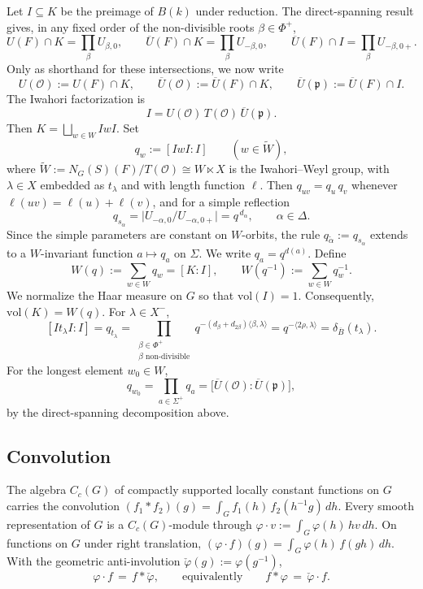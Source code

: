 \documentclass[12pt]{article}
\numberwithin{equation}{section}
\theoremstyle{definition}
\theoremstyle{remark}
\theoremstyle{plain}
\begin{document}
Let $I\subseteq K$ be the preimage of $B(k)$ under reduction. The direct-spanning result \cite[Proposition 7.3.12]{KP} gives, in any fixed order of the non-divisible roots $\beta\in\Phi^+$,
$$U(F)\cap K=\prod_\beta U_{\beta,0},\qquad \overline U(F)\cap K=\prod_\beta U_{-\beta,0},\qquad \overline U(F)\cap I=\prod_\beta U_{-\beta,0+}.$$
Only as shorthand for these intersections, we now write
$$U(\mathcal O):=U(F)\cap K,\qquad \overline U(\mathcal O):=\overline U(F)\cap K,\qquad \overline U(\mathfrak p):=\overline U(F)\cap I.$$
The Iwahori factorization \cite[Corollary 7.4.9]{KP} is
$$I=U(\mathcal O)\,T(\mathcal O)\,\overline U(\mathfrak p).$$
Then $K=\bigsqcup_{w\in W}IwI$. Set
$$q_w := [IwI : I] \qquad (w \in \widetilde{W}),$$
where $\widetilde{W} := N_G(S)(F)/T(\mathcal{O}) \cong W \ltimes X$ is the Iwahori--Weyl group, with $\lambda \in X$ embedded as $t_\lambda$ and with length function $\ell$. Then $q_{uv} = q_u\, q_v$ whenever $\ell(uv) = \ell(u) + \ell(v)$, and for a simple reflection
$$q_{s_\alpha} = \bigl|U_{-\alpha,0}/U_{-\alpha,0+}\bigr| = q^{\,d_\alpha}, \qquad \alpha \in \Delta.$$
Since the simple parameters are constant on $W$-orbits, the rule $q_{\tilde\alpha}:=q_{s_\alpha}$ extends to a $W$-invariant function $a\mapsto q_a$ on $\Sigma$. We write $q_a=q^{d(a)}$. Define
$$W(q) := \sum_{w\in W}q_w = [K : I], \qquad W(q^{-1}) := \sum_{w\in W}q_w^{-1}.$$
We normalize the Haar measure on $G$ so that $\mathrm{vol}(I) = 1$. Consequently, $\mathrm{vol}(K) = W(q)$. For $\lambda\in X^{-}$,
$$[It_\lambda I : I] = q_{t_\lambda} = \prod_{\substack{\beta\in\Phi^+\\ \beta\text{ non-divisible}}}q^{-(d_\beta+d_{2\beta})\langle\beta,\lambda\rangle} = q^{-\langle 2\rho,\lambda\rangle} = \delta_{\overline B}(t_\lambda).$$
For the longest element $w_0 \in W$,
$$q_{w_0} = \prod_{a\in\Sigma^+}q_a = \big[\overline{U}(\mathcal{O}) : \overline{U}(\mathfrak{p})\big],$$
by the direct-spanning decomposition above.

\subsection{Convolution}
The algebra $C_c(G)$ of compactly supported locally constant functions on $G$ carries the convolution $(f_1 * f_2)(g) = \int_G f_1(h)\, f_2(h^{-1}g)\, dh$. Every smooth representation of $G$ is a $C_c(G)$-module through $\varphi \cdot v := \int_{G} \varphi(h)\, hv\, dh$. On functions on $G$ under right translation, $(\varphi\cdot f)(g) = \int_G \varphi(h)\,f(gh)\,dh$. With the geometric anti-involution $\check{\varphi}(g) := \varphi(g^{-1})$,
$$\varphi\cdot f \,=\, f * \check{\varphi}, \qquad \text{equivalently} \qquad f * \varphi \,=\, \check{\varphi}\cdot f.$$
\end{document}
